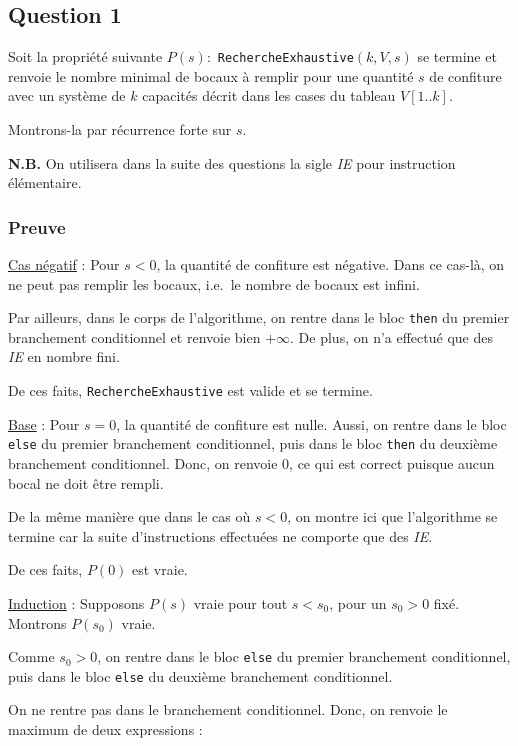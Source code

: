 \documentclass[12pt,a4paper]{article}
\begin{document}
\subsection*{Question 1}
Soit la propri\'et\'e suivante \( P(s) : \) \texttt{RechercheExhaustive}$(k,V,s)$ se termine et renvoie le nombre minimal de bocaux \`a remplir pour une quantit\'e $s$ de confiture avec un syst\`eme de $k$ capacit\'es d\'ecrit dans les cases du tableau $V[1..k]$.

Montrons-la par r\'ecurrence forte sur $s$.

{\bfseries N.B.} On utilisera dans la suite des questions la sigle {\itshape IE} pour instruction \'el\'ementaire.

\subsubsection*{Preuve}
\underline{Cas n\'egatif} : Pour $s < 0$, la quantit\'e de confiture est n\'egative. Dans ce cas-l\`a, on ne peut pas remplir les bocaux, i.e.\ le nombre de bocaux est infini. 

Par ailleurs, dans le corps de l'algorithme, on rentre dans le bloc \texttt{then} du premier branchement conditionnel et renvoie bien $+\infty$. De plus, on n'a effectu\'e que des {\itshape IE} en nombre fini.

De ces faits, \texttt{RechercheExhaustive} est valide et se termine.

\underline{Base} : Pour \( s = 0\), la quantit\'e de confiture est nulle. Aussi, on rentre dans le bloc \texttt{else} du premier branchement conditionnel, puis dans le bloc \texttt{then} du deuxi\`eme branchement conditionnel. Donc, on renvoie $0$, ce qui est correct puisque aucun bocal ne doit \^etre rempli. 

De la m\^eme mani\`ere que dans le cas o\`u $s<0$, on montre ici que l'algorithme se termine car la suite d'instructions effectu\'ees ne comporte que des {\itshape IE}.

De ces faits, $P(0)$ est vraie.

\underline{Induction} : Supposons \( P(s) \) vraie pour tout \( s < s_0 \), pour un $s_0>0$ fix\'e. Montrons \( P(s_0) \) vraie.

Comme $s_0 > 0$, on rentre dans le bloc \texttt{else} du premier branchement conditionnel, puis dans le bloc \texttt{else} du deuxi\`eme branchement conditionnel. 

On ne rentre pas dans le branchement conditionnel. Donc, on renvoie le maximum de deux expressions :
	
\end{document}

